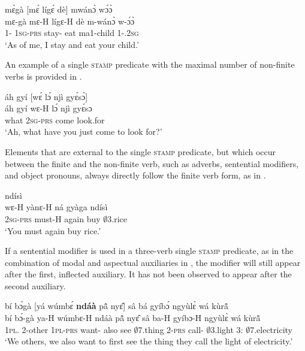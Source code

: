\ea\label{Compmin}
  \glll  mɛ̀gà [mɛ́ lígɛ́ dè] mwánɔ̀ wɔ́ɔ̀ \\
        mɛ-gà {\db}mɛ-H lígɛ-H dè m-wánɔ̀ w-ɔ́ɔ̀ \\
          1-{\CONTR} {\db}1\textsc{sg}-\textsc{prs} stay-{\R} eat ma1-child 1-{\POSS}.2\textsc{sg}  \\
    \trans `As of me, I stay and eat your child.'
\z

\noindent An example of a single \textsc{stamp} predicate with the maximal number of non-finite verbs is provided in .

\ea\label{Compmax}
  \glll  áh gyí [wɛ́ lɔ́ njì gyɛ́sɔ̀] \\
        áh gyí {\db}wɛ-H lɔ́ njì gyɛ́sɔ \\
           {\EXCL} what {\db}2\textsc{sg}-\textsc{prs} {\RETRO} come look.for\\
    \trans `Ah, what have you just come to look for?'
\z

Elements that are external to the single \textsc{stamp} predicate, but which occur between the finite and the non-finite verb, such as adverbs, sentential modifiers, and object pronouns, always directly follow  the finite verb form, as in .

\ea\label{AUXadv1}
   ndísì \\
     {\db}wɛ-H yànɛ-H ná gyàga ndísì \\
        {\db}2\textsc{sg}-\textsc{prs} must-H again buy $\emptyset$3.rice\\
    \trans `You must again buy rice.'
\z

If a sentential modifier is used in a three-verb single \textsc{stamp} predicate, as in the combination of modal and aspectual auxiliaries in , the modifier will still appear after the first, inflected auxiliary. It has not been observed to appear after the second auxiliary.

\ea\label{AUXadv2}
  \glll  bí bɔ́gà [yá wúmbɛ́ {\bfseries ndáà} pã̂ nyɛ̂] sâ bá gyíbɔ́ ngyùlɛ̀ wá kùrã̂ \\
         bí bɔ́-gà {\db}ya-H wúmbɛ-H ndáà pã̂ nyɛ̂ sâ ba-H gyíbɔ-H ngyùlɛ̀ wá kùrã̂ \\
          1\textsc{pl}.{\SBJ} 2-other {\db}1\textsc{pl}-\textsc{prs} want-{\R} also {\PRIOR} see $\emptyset$7.thing 2-\textsc{prs} call-{\R} $\emptyset$3.light 3:{\ATT} $\emptyset$7.electricity\\
    \trans `We others, we also want to first see the thing they call the light of electricity.'
\z

